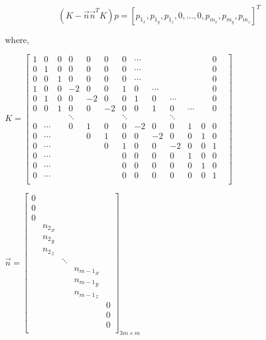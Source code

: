 \begin{equation}
\left ( K-\vec{n}\vec{n}^{T}K \right )p=[p_{1_{x}}, p_{1_{y}}, p_{1_{z}},0, ... ,0,p_{m_{x}},p_{m_{y}},p_{m_{z}}]^{T}
\label{equation:first_approxi_geodesic}
\end{equation}
 
where, 
 
$K=
\begin{bmatrix}
 1&  0&  0&  0&  0&   0&  0& \cdots  &   &  & &  & 0  \\
 0&  1&  0&  0&  0&   0&  0& \cdots  &   &  & & & 0  \\
 0&  0&  1&  0&  0&   0&  0& \cdots  &   &  & & & 0  \\
 1&  0&  0&  -2&  0&  0&  1&  0&\cdots&  &  &  &0 \\
 0&  1&  0&  0&  -2&  0&  0&  1&  0&\cdots&  &  &0 \\
 0&  0&  1&  0&  0&  -2&  0&  0&  1&  0&\cdots& &0  \\
 &   &	  &\ddots &    &   &\ddots   &   &   &\ddots   &   &   &\\	
 0&\cdots &  &  0&  1&  0&  0&  -2&  0&  0&  1&  0&  0 \\
 0&\cdots &  &  &  0&  1&  0&  0&  -2&  0&  0&  1&  0 \\
 0&\cdots &  &  &  &  0&  1&  0&  0&  -2&  0&  0&  1 \\
 0&  \cdots&  &  &  &  &  0&  0&  0&  0& 1&  0& 0&\\
 0&  \cdots&  &  &  &  &  0&  0&  0&  0&  0&  1& 0&\\
 0&  \cdots&  &  &  &  &  0&  0&  0&  0&  0&  0& 1&\\
\end{bmatrix}
$

$\vec{n}=
\begin{bmatrix}
 	0 			&			&			&			&\\		
 	0 			&			&			&			&\\
 	0 			&			&			&			&\\
 	&			{n_{2}}_{x} & 			&			&\\
	&			{n_{2}}_{y} &			&			&\\
 	&			{n_{2}}_{z} &			&			&\\
 	&  			& 			\ddots		&			&\\ 	
 	&  			&  			&  			{n_{m-1}}_{x}&\\ 
 	&			&			&			{n_{m-1}}_{y}&\\
 	&			&			&			{n_{m-1}}_{z}&\\ 
 	&			&			&			&			0\\	
 	&			&			&			&			0\\
 	&			&			&			&			0\\
\end{bmatrix}_{3m\times m}
$

